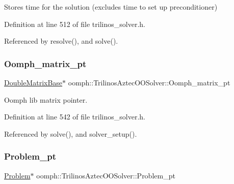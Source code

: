 Stores time for the solution (excludes time to set up preconditioner) 



Definition at line 512 of file trilinos\+\_\+solver.\+h.



Referenced by resolve(), and solve().

\mbox{\label{classoomph_1_1TrilinosAztecOOSolver_a71d7437b0502f3be59f64258e0af458e}} 
\subsubsection{\texorpdfstring{Oomph\+\_\+matrix\+\_\+pt}{Oomph\_matrix\_pt}}
{\footnotesize\ttfamily \hyperlink{classoomph_1_1DoubleMatrixBase}{Double\+Matrix\+Base}$\ast$ oomph\+::\+Trilinos\+Aztec\+O\+O\+Solver\+::\+Oomph\+\_\+matrix\+\_\+pt\hspace{0.3cm}{\ttfamily [protected]}}



Oomph lib matrix pointer. 



Definition at line 542 of file trilinos\+\_\+solver.\+h.



Referenced by solve(), and solver\+\_\+setup().

\mbox{\label{classoomph_1_1TrilinosAztecOOSolver_abc6a63eb67694f7ac5dfc8505a8b9a5f}} 
\subsubsection{\texorpdfstring{Problem\+\_\+pt}{Problem\_pt}}
{\footnotesize\ttfamily \hyperlink{classoomph_1_1Problem}{Problem}$\ast$ oomph\+::\+Trilinos\+Aztec\+O\+O\+Solver\+::\+Problem\+\_\+pt\hspace{0.3cm}{\ttfamily [protected]}}



